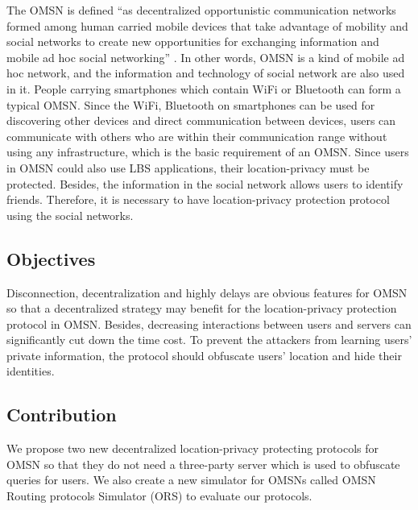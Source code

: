 The OMSN is defined ``as decentralized opportunistic communication networks formed among human carried mobile devices that take advantage of mobility and social networks to create new opportunities for exchanging information and mobile ad hoc social networking'' \cite {C2}. In other words, OMSN is a kind of mobile ad hoc network, and the information and technology of social network are also used in it. People carrying smartphones which contain WiFi or Bluetooth can form a typical OMSN. Since the WiFi, Bluetooth on smartphones can be used for discovering other devices and direct communication between devices, users can communicate with others who are within their communication range without using any infrastructure, which is the basic requirement of an OMSN. Since users in OMSN could also use LBS applications, their location-privacy must be protected. Besides, the information in the social network allows users to identify friends. Therefore, it is necessary to have location-privacy protection protocol using the social networks.


\subsection{ Objectives}

\noindent Disconnection, decentralization and highly delays are obvious features for OMSN so that a decentralized strategy may benefit for the location-privacy protection protocol in OMSN. Besides, decreasing interactions between users and servers can significantly cut down the time cost. To prevent the attackers from learning users' private information, the protocol should obfuscate users' location and hide their identities.


\subsection{ Contribution}

\noindent We propose two new decentralized location-privacy protecting protocols for OMSN so that they do not need a three-party server which is used to obfuscate queries for users. We also create a new simulator for OMSNs called OMSN Routing protocols Simulator (ORS) to evaluate our protocols.

